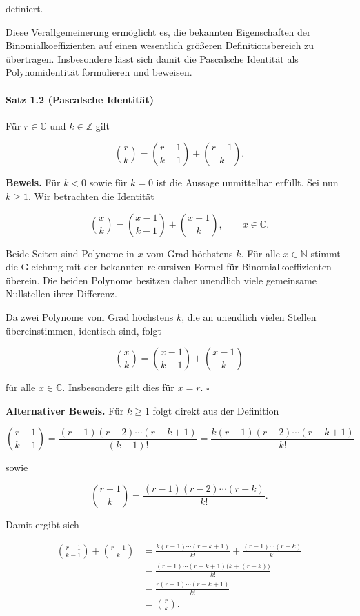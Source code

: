 \documentclass{article}
\begin{document}
definiert.

Diese Verallgemeinerung ermöglicht es, die bekannten Eigenschaften der Binomialkoeffizienten auf einen wesentlich größeren Definitionsbereich zu übertragen. Insbesondere lässt sich damit die Pascalsche Identität als Polynomidentität formulieren und beweisen.

\paragraph{Satz 1.2 (Pascalsche Identität)}

Für \(r\in\mathbb C\) und \(k\in\mathbb Z\) gilt

\[
\binom{r}{k}
=
\binom{r-1}{k-1}
+
\binom{r-1}{k}.
\]

\textbf{Beweis.}
Für \(k<0\) sowie für \(k=0\) ist die Aussage unmittelbar erfüllt.
Sei nun \(k\geq 1\). Wir betrachten die Identität

\[
\binom{x}{k}
=
\binom{x-1}{k-1}
+
\binom{x-1}{k},
\qquad x\in\mathbb C.
\]

Beide Seiten sind Polynome in \(x\) vom Grad höchstens \(k\). Für alle
\(x\in\mathbb N\) stimmt die Gleichung mit der bekannten rekursiven Formel
für Binomialkoeffizienten überein. Die beiden Polynome besitzen daher
unendlich viele gemeinsame Nullstellen ihrer Differenz.

Da zwei Polynome vom Grad höchstens \(k\), die an unendlich vielen Stellen
übereinstimmen, identisch sind, folgt

\[
\binom{x}{k}
=
\binom{x-1}{k-1}
+
\binom{x-1}{k}
\]

für alle \(x\in\mathbb C\). Insbesondere gilt dies für \(x=r\).
\hfill\(\square\)

\medskip

\textbf{Alternativer Beweis.}
Für \(k\geq 1\) folgt direkt aus der Definition

\[
\binom{r-1}{k-1}
=
\frac{(r-1)(r-2)\cdots(r-k+1)}{(k-1)!}
=
\frac{k(r-1)(r-2)\cdots(r-k+1)}{k!}
\]

sowie

\[
\binom{r-1}{k}
=
\frac{(r-1)(r-2)\cdots(r-k)}{k!}.
\]

Damit ergibt sich

\[
\begin{aligned}
\binom{r-1}{k-1}
+\binom{r-1}{k}
&=
\frac{k(r-1)\cdots(r-k+1)}{k!}
+\frac{(r-1)\cdots(r-k)}{k!}\\[1ex]
&=
\frac{(r-1)\cdots(r-k+1)\bigl(k+(r-k)\bigr)}{k!}\\[1ex]
&=
\frac{r(r-1)\cdots(r-k+1)}{k!}\\[1ex]
&=
\binom{r}{k}.
\end{aligned}
\]
\end{document}
